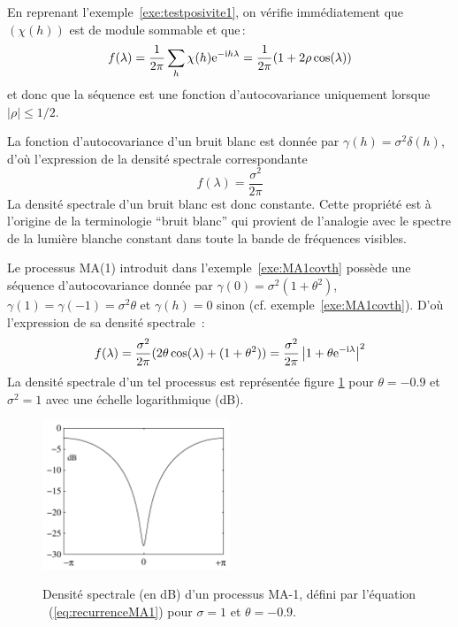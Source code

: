 \begin{example}
En reprenant l'exemple~\ref{exe:testposivite1}, on v\'erifie
imm\'ediatement que $(\chi(h))$ est de module sommable et que\,:
$$
 f(\lambda)=\frac{1}{2\pi}\sum_h \chi(h)\mathrm{e}^{-\mathrm{i} h \lambda}
     =\frac{1}{2\pi}(1+2\rho\cos( \lambda))
     $$
     et donc que la s\'equence est une fonction d'autocovariance uniquement
     lorsque $|\rho|\leq 1/2$.
\end{example}
\begin{example}
  La fonction d'autocovariance d'un bruit blanc est donn\'ee par $\gamma(h)=
  \sigma^2 \delta(h)$, d'o\`u l'expression de la densit\'e spectrale correspondante
\[
 f(\lambda) = \frac{\sigma^2}{2\pi}
\]
La densit\'e spectrale d'un bruit blanc est donc constante. Cette
propri\'et\'e est \`a l'origine de la terminologie ``bruit blanc'' qui
provient de l'analogie avec le spectre de la lumi\`ere blanche
constant dans toute la bande de fr\'equences visibles.
\end{example}
\begin{example}
  \label{ex:MA1dsp}
  Le processus MA(1) introduit dans l'exemple~\ref{exe:MA1covth} poss\`ede une
  s\'equence d'autocovariance donn\'ee par $\gamma(0) = \sigma^2(1+\theta^2)$,
  $\gamma(1) = \gamma(-1) = \sigma^2 \theta$ et $\gamma(h) = 0$ sinon (cf.
  exemple~\ref{exe:MA1covth}). D'o\`u l'expression de sa densit\'e spectrale~:
\[
 f(\lambda)= \frac{\sigma^2}{2 \pi} (2 \theta \cos(\lambda) + (1+ \theta^2))
     = \frac{\sigma^2}{2 \pi} \left |1+ \theta \mathrm{e}^{-\mathrm{i}\lambda}\right |^2
\]
La densit\'e spectrale d'un tel processus est repr\'esent\'ee figure
\ref{fig:dspthMA1} pour $\theta = -0.9$ et $\sigma^2=1$ avec une
\'echelle logarithmique (dB).
\end{example}
\begin{figure}
  \centering
  \includegraphics[width=0.5\textwidth]{Figures/dspthMA1}\\
  \caption{Densit\'e spectrale (en dB) d'un processus MA-1, d\'efini par l'\'equation
~(\ref{eq:recurrenceMA1}) pour $\sigma=1$ et $\theta=-0.9$.}\label{fig:dspthMA1}
\end{figure}

